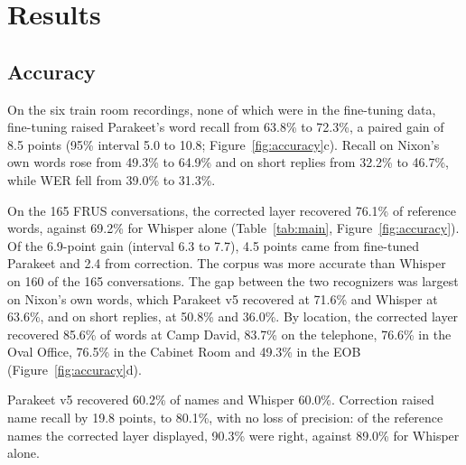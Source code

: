 \section{Results}
\label{sec:results}

\subsection{Accuracy}
\label{sec:res-acc}

 On the six train room recordings, none of which were in the fine-tuning data, fine-tuning raised Parakeet's word recall from 63.8\% to 72.3\%, a paired gain of 8.5 points (95\% interval 5.0 to 10.8; Figure~\ref{fig:accuracy}c). Recall on Nixon's own words rose from 49.3\% to 64.9\% and on short replies from 32.2\% to 46.7\%, while WER fell from 39.0\% to 31.3\%.

 On the 165 FRUS conversations, the corrected layer recovered 76.1\% of reference words, against 69.2\% for Whisper alone (Table~\ref{tab:main}, Figure~\ref{fig:accuracy}). Of the 6.9-point gain (interval 6.3 to 7.7), 4.5 points came from fine-tuned Parakeet and 2.4 from correction. The corpus was more accurate than Whisper on 160 of the 165 conversations. The gap between the two recognizers was largest on Nixon's own words, which Parakeet v5 recovered at 71.6\% and Whisper at 63.6\%, and on short replies, at 50.8\% and 36.0\%. By location, the corrected layer recovered 85.6\% of words at Camp David, 83.7\% on the telephone, 76.6\% in the Oval Office, 76.5\% in the Cabinet Room and 49.3\% in the EOB (Figure~\ref{fig:accuracy}d).

 Parakeet v5 recovered 60.2\% of names and Whisper 60.0\%. Correction raised name recall by 19.8 points, to 80.1\%, with no loss of precision: of the reference names the corrected layer displayed, 90.3\% were right, against 89.0\% for Whisper alone.

